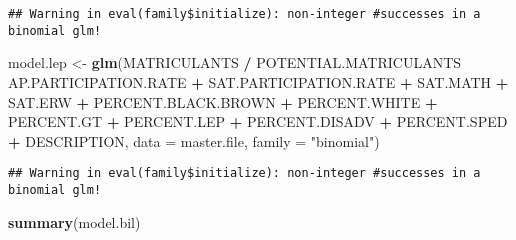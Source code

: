 \documentclass[
]{article}
\newenvironment{Shaded}{\begin{snugshade}}{\end{snugshade}}
\newcommand{\DataTypeTok}[1]{\textcolor[rgb]{0.13,0.29,0.53}{#1}}
\newcommand{\KeywordTok}[1]{\textcolor[rgb]{0.13,0.29,0.53}{\textbf{#1}}}
\newcommand{\NormalTok}[1]{#1}
\newcommand{\OperatorTok}[1]{\textcolor[rgb]{0.81,0.36,0.00}{\textbf{#1}}}
\newcommand{\StringTok}[1]{\textcolor[rgb]{0.31,0.60,0.02}{#1}}
\begin{document}
\begin{verbatim}
## Warning in eval(family$initialize): non-integer #successes in a binomial glm!
\end{verbatim}

\begin{Shaded}
\begin{Highlighting}[]
\NormalTok{model.lep <-}\StringTok{ }\KeywordTok{glm}\NormalTok{(MATRICULANTS }\OperatorTok{/}\StringTok{ }\NormalTok{POTENTIAL.MATRICULANTS }\OperatorTok{~}\StringTok{ }\NormalTok{AP.PARTICIPATION.RATE }\OperatorTok{+}\StringTok{ }\NormalTok{SAT.PARTICIPATION.RATE }\OperatorTok{+}\StringTok{ }\NormalTok{SAT.MATH }\OperatorTok{+}\StringTok{ }\NormalTok{SAT.ERW }\OperatorTok{+}\StringTok{ }\NormalTok{PERCENT.BLACK.BROWN }\OperatorTok{+}\StringTok{ }\NormalTok{PERCENT.WHITE }\OperatorTok{+}\StringTok{ }\NormalTok{PERCENT.GT }\OperatorTok{+}\StringTok{ }\NormalTok{PERCENT.LEP }\OperatorTok{+}\StringTok{ }\NormalTok{PERCENT.DISADV }\OperatorTok{+}\StringTok{ }\NormalTok{PERCENT.SPED }\OperatorTok{+}\StringTok{ }\NormalTok{DESCRIPTION, }\DataTypeTok{data =}\NormalTok{ master.file, }\DataTypeTok{family =} \StringTok{"binomial"}\NormalTok{)}
\end{Highlighting}
\end{Shaded}

\begin{verbatim}
## Warning in eval(family$initialize): non-integer #successes in a binomial glm!
\end{verbatim}

\begin{Shaded}
\begin{Highlighting}[]
\KeywordTok{summary}\NormalTok{(model.bil)}
\end{Highlighting}
\end{Shaded}
\end{document}
